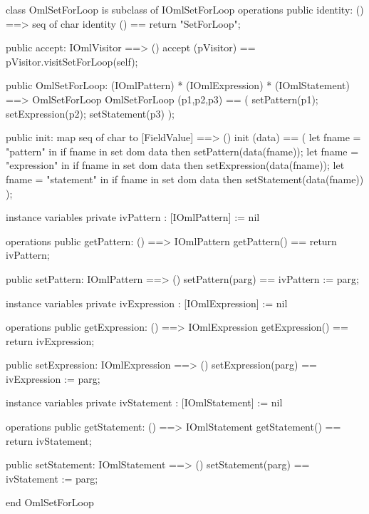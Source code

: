 \begin{vdm_al}
class OmlSetForLoop is subclass of IOmlSetForLoop
operations
  public identity: () ==> seq of char
  identity () == return "SetForLoop";

  public accept: IOmlVisitor ==> ()
  accept (pVisitor) == pVisitor.visitSetForLoop(self);

  public OmlSetForLoop:
      (IOmlPattern) *
      (IOmlExpression) *
      (IOmlStatement) ==> OmlSetForLoop
  OmlSetForLoop (p1,p2,p3) == 
   ( setPattern(p1);
     setExpression(p2);
     setStatement(p3) );

  public init: map seq of char to [FieldValue] ==> ()
  init (data) ==
    ( let fname = "pattern" in
        if fname in set dom data
        then setPattern(data(fname));
      let fname = "expression" in
        if fname in set dom data
        then setExpression(data(fname));
      let fname = "statement" in
        if fname in set dom data
        then setStatement(data(fname)) );

instance variables
  private ivPattern : [IOmlPattern] := nil

operations
  public getPattern: () ==> IOmlPattern
  getPattern() == return ivPattern;

  public setPattern: IOmlPattern ==> ()
  setPattern(parg) == ivPattern := parg;

instance variables
  private ivExpression : [IOmlExpression] := nil

operations
  public getExpression: () ==> IOmlExpression
  getExpression() == return ivExpression;

  public setExpression: IOmlExpression ==> ()
  setExpression(parg) == ivExpression := parg;

instance variables
  private ivStatement : [IOmlStatement] := nil

operations
  public getStatement: () ==> IOmlStatement
  getStatement() == return ivStatement;

  public setStatement: IOmlStatement ==> ()
  setStatement(parg) == ivStatement := parg;

end OmlSetForLoop
\end{vdm_al}

